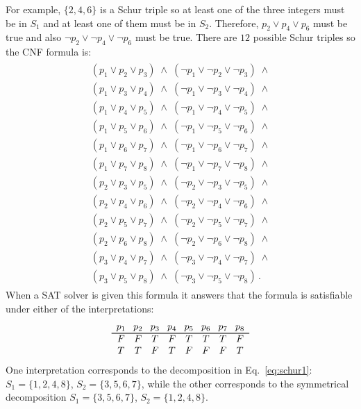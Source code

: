 For example, $\{2,4,6\}$ is a Schur triple so at least one of the three integers must be in $S_1$ and at least one of them must be in $S_2$. Therefore, $p_2 \vee p_4 \vee p_6$ must be true and also $\neg p_2 \vee \neg p_4 \vee \neg p_6$ must be true. There are $12$ possible Schur triples so the CNF formula is:
\begin{align}
\begin{array}{l}
(p_1 \vee p_2 \vee p_3) \;\wedge\; (\neg p_1 \vee \neg p_2 \vee \neg p_3) \;\wedge \\
(p_1 \vee p_3 \vee p_4) \;\wedge\; (\neg p_1 \vee \neg p_3 \vee \neg p_4) \;\wedge \\
(p_1 \vee p_4 \vee p_5) \;\wedge\; (\neg p_1 \vee \neg p_4 \vee \neg p_5) \;\wedge \\
(p_1 \vee p_5 \vee p_6) \;\wedge\; (\neg p_1 \vee \neg p_5 \vee \neg p_6) \;\wedge \\
(p_1 \vee p_6 \vee p_7) \;\wedge\; (\neg p_1 \vee \neg p_6 \vee \neg p_7) \;\wedge \\
(p_1 \vee p_7 \vee p_8) \;\wedge\; (\neg p_1 \vee \neg p_7 \vee \neg p_8) \;\wedge \\
(p_2 \vee p_3 \vee p_5) \;\wedge\; (\neg p_2 \vee \neg p_3 \vee \neg p_5) \;\wedge \\
(p_2 \vee p_4 \vee p_6) \;\wedge\; (\neg p_2 \vee \neg p_4 \vee \neg p_6) \;\wedge \\
(p_2 \vee p_5 \vee p_7) \;\wedge\; (\neg p_2 \vee \neg p_5 \vee \neg p_7) \;\wedge \\
(p_2 \vee p_6 \vee p_8) \;\wedge\; (\neg p_2 \vee \neg p_6 \vee \neg p_8) \;\wedge \\
(p_3 \vee p_4 \vee p_7) \;\wedge\; (\neg p_3 \vee \neg p_4 \vee \neg p_7) \;\wedge \\
(p_3 \vee p_5 \vee p_8) \;\wedge\; (\neg p_3 \vee \neg p_5 \vee \neg p_8)\,.
\end{array}\label{eq.schur2}
\end{align}
When a SAT solver is given this formula it answers that the formula is satisfiable under either of the interpretations:
\[
\begin{array}{c@{\hspace{8pt}}c@{\hspace{8pt}}c@{\hspace{8pt}}c@{\hspace{8pt}}c@{\hspace{8pt}}c@{\hspace{8pt}}c@{\hspace{8pt}}c}
p_1&p_2&p_3&p_4&p_5&p_6&p_7&p_8\\\svhline
F&F&T&F&T&T&T&F\\
T&T&F&T&F&F&F&T
\end{array}
\]
One interpretation corresponds to the decomposition in Eq.~\ref{eq:schur1}: $S_1=\{1,2,4,8\}$, $S_2=\{3,5,6,7\}$, while the other corresponds to the symmetrical decomposition $S_1=\{3,5,6,7\}$, $S_2=\{1,2,4,8\}$.

